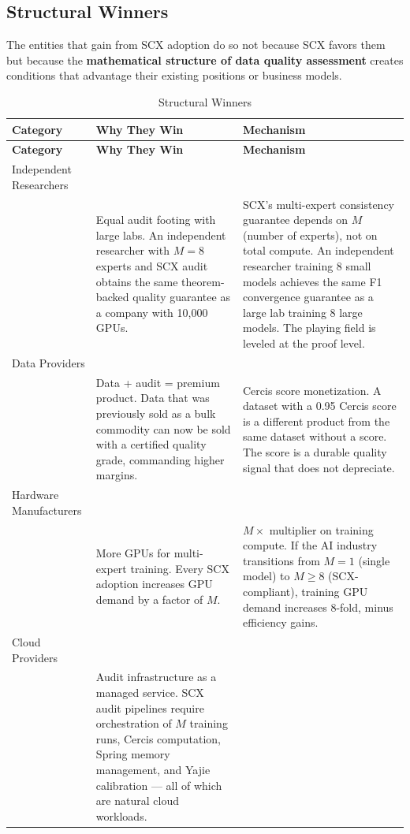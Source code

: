\documentclass[12pt,a4paper]{article}
\theoremstyle{remark}
\begin{document}
\subsection{Structural Winners}
The entities that gain from SCX adoption do so not because SCX favors them 
but because the \textbf{mathematical structure of data quality assessment} 
creates conditions that advantage their existing positions or business models.
\begin{longtable}{@{}p{3cm} p{5cm} p{6cm}@{}}
\caption{Structural Winners} \\
\toprule
\textbf{Category } & \textbf{Why They Win } & \textbf{Mechanism } \\
\midrule
\endfirsthead
\midrule
\textbf{Category} & \textbf{Why They Win} & \textbf{Mechanism} \\
\midrule
\endhead
\bottomrule
\endfoot
Independent Researchers\\ &
Equal audit footing with large labs. An independent researcher with $M=8$ 
experts and SCX audit obtains the same theorem-backed quality guarantee as 
a company with 10,000 GPUs. &
SCX's multi-expert consistency guarantee depends on $M$ (number of experts), 
not on total compute. An independent researcher training 8 small models achieves 
the same F1 convergence guarantee as a large lab training 8 large models. The 
playing field is leveled at the proof level. \\
\addlinespace
Data Providers\\ &
Data + audit = premium product. Data that was previously sold as a bulk commodity 
can now be sold with a certified quality grade, commanding higher margins. &
Cercis score monetization. A dataset with a 0.95 Cercis score is a different 
product from the same dataset without a score. The score is a durable quality 
signal that does not depreciate. \\
\addlinespace
Hardware Manufacturers\\ &
More GPUs for multi-expert training. Every SCX adoption increases GPU demand 
by a factor of $M$. &
$M \times$ multiplier on training compute. If the AI industry transitions from 
$M=1$ (single model) to $M \geq 8$ (SCX-compliant), training GPU demand increases 
8-fold, minus efficiency gains. \\
\addlinespace
Cloud Providers\\ &
Audit infrastructure as a managed service. SCX audit pipelines require 
orchestration of $M$ training runs, Cercis computation, Spring memory management, 
and Yajie calibration --- all of which are natural cloud workloads. &

\end{longtable}
\end{document}
